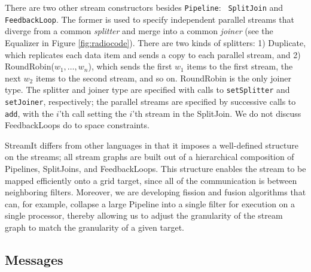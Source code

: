 \documentclass{sig-alternate}
\begin{document}
There are two other stream constructors besides {\tt Pipeline}: {\tt
SplitJoin} and {\tt FeedbackLoop}.  The former is used to specify
independent parallel streams that diverge from a common {\it splitter}
and merge into a common {\it joiner} (see the Equalizer in Figure
\ref{fig:radiocode}).  There are two kinds of splitters: 1) Duplicate,
which replicates each data item and sends a copy to each parallel
stream, and 2) RoundRobin($w_1, \dots, w_n$), which sends the first
$w_1$ items to the first stream, the next $w_2$ items to the second
stream, and so on.  RoundRobin is the only joiner type.  The splitter
and joiner type are specified with calls to {\tt setSplitter} and {\tt
setJoiner}, respectively; the parallel streams are specified by
successive calls to {\tt add}, with the $i$'th call setting the $i$'th
stream in the SplitJoin.  We do not discuss FeedbackLoops do to space
constraints.


StreamIt differs from other languages in that it imposes a
well-defined structure on the streams; all stream graphs are built out
of a hierarchical composition of Pipelines, SplitJoins, and
FeedbackLoops.  This structure enables the stream to be mapped
efficiently onto a grid target, since all of the communication is
between neighboring filters.  Moreover, we are developing fission and
fusion algorithms that can, for example, collapse a large Pipeline
into a single filter for execution on a single processor, thereby
allowing us to adjust the granularity of the stream graph to match the
granularity of a given target.


\subsection{Messages}
\end{document}
